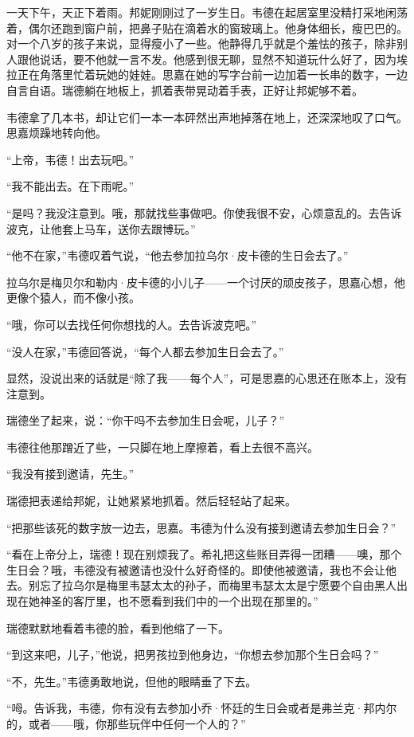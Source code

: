 \par 一天下午，天正下着雨。邦妮刚刚过了一岁生日。韦德在起居室里没精打采地闲荡着，偶尔还跑到窗户前，把鼻子贴在滴着水的窗玻璃上。他身体细长，瘦巴巴的。对一个八岁的孩子来说，显得瘦小了一些。他静得几乎就是个羞怯的孩子，除非别人跟他说话，要不他就一言不发。他感到很无聊，显然不知道玩什么好了，因为埃拉正在角落里忙着玩她的娃娃。思嘉在她的写字台前一边加着一长串的数字，一边自言自语。瑞德躺在地板上，抓着表带晃动着手表，正好让邦妮够不着。
\par 韦德拿了几本书，却让它们一本一本砰然出声地掉落在地上，还深深地叹了口气。思嘉烦躁地转向他。
\par “上帝，韦德！出去玩吧。”
\par “我不能出去。在下雨呢。”
\par “是吗？我没注意到。哦，那就找些事做吧。你使我很不安，心烦意乱的。去告诉波克，让他套上马车，送你去跟博玩。”
\par “他不在家，”韦德叹着气说，“他去参加拉乌尔·皮卡德的生日会去了。”
\par 拉乌尔是梅贝尔和勒内·皮卡德的小儿子——一个讨厌的顽皮孩子，思嘉心想，他更像个猿人，而不像小孩。
\par “哦，你可以去找任何你想找的人。去告诉波克吧。”
\par “没人在家，”韦德回答说，“每个人都去参加生日会去了。”
\par 显然，没说出来的话就是“除了我——每个人”，可是思嘉的心思还在账本上，没有注意到。
\par 瑞德坐了起来，说：“你干吗不去参加生日会呢，儿子？”
\par 韦德往他那蹭近了些，一只脚在地上摩擦着，看上去很不高兴。
\par “我没有接到邀请，先生。”
\par 瑞德把表递给邦妮，让她紧紧地抓着。然后轻轻站了起来。
\par “把那些该死的数字放一边去，思嘉。韦德为什么没有接到邀请去参加生日会？”
\par “看在上帝分上，瑞德！现在别烦我了。希礼把这些账目弄得一团糟——噢，那个生日会？哦，韦德没有被邀请也没什么好奇怪的。即使他被邀请，我也不会让他去。别忘了拉乌尔是梅里韦瑟太太的孙子，而梅里韦瑟太太是宁愿要个自由黑人出现在她神圣的客厅里，也不愿看到我们中的一个出现在那里的。”
\par 瑞德默默地看着韦德的脸，看到他缩了一下。
\par “到这来吧，儿子，”他说，把男孩拉到他身边，“你想去参加那个生日会吗？”
\par “不，先生。”韦德勇敢地说，但他的眼睛垂了下去。
\par “呣。告诉我，韦德，你有没有去参加小乔·怀廷的生日会或者是弗兰克·邦内尔的，或者——哦，你那些玩伴中任何一个人的？”

